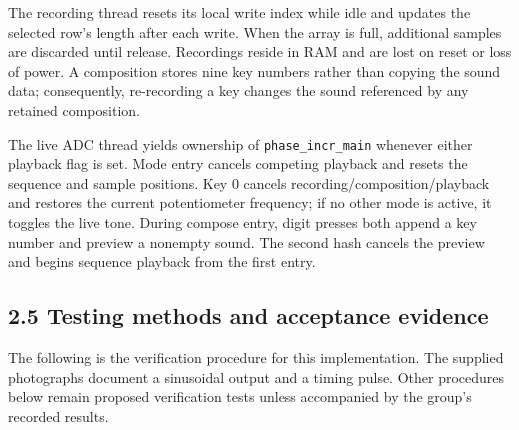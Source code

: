 \documentclass[11pt,letterpaper]{article}
\begin{document}
The recording thread resets its local write index while idle and updates the selected row's length after each write. When the array is full, additional samples are discarded until release. Recordings reside in RAM and are lost on reset or loss of power. A composition stores nine key numbers rather than copying the sound data; consequently, re-recording a key changes the sound referenced by any retained composition.

The live ADC thread yields ownership of \texttt{phase\_incr\_main} whenever either playback flag is set. Mode entry cancels competing playback and resets the sequence and sample positions. Key 0 cancels recording/composition/playback and restores the current potentiometer frequency; if no other mode is active, it toggles the live tone. During compose entry, digit presses both append a key number and preview a nonempty sound. The second hash cancels the preview and begins sequence playback from the first entry.

\subsection*{2.5 Testing methods and acceptance evidence}

The following is the verification procedure for this implementation. The supplied photographs document a sinusoidal output and a timing pulse. Other procedures below remain proposed verification tests unless accompanied by the group's recorded results.
\end{document}
